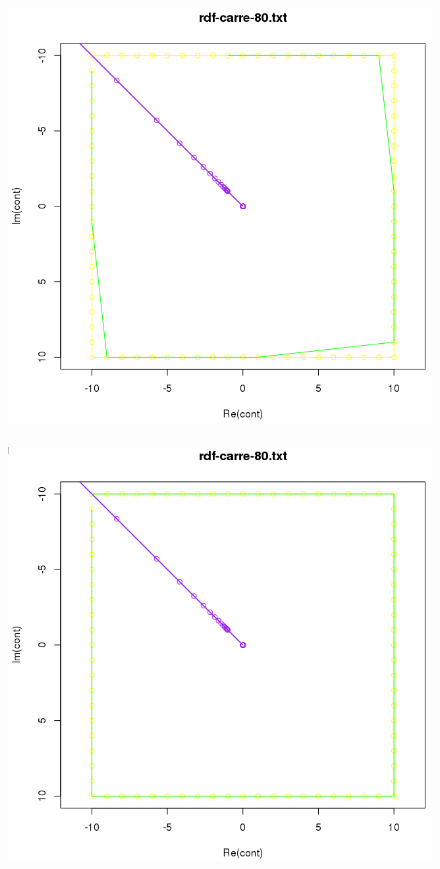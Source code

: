 \documentclass[a4paper,12pt]{report}
\begin{document}
\begin{figure}[!ht]
	\hbox{ 
     	\hspace*{1cm}
		\includegraphics[scale=0.3]{image/fourier3.png}
     	\hspace*{1cm}
		\includegraphics[scale=0.3]{image/fourier4.png}
	}
\end{figure}
\end{document}
